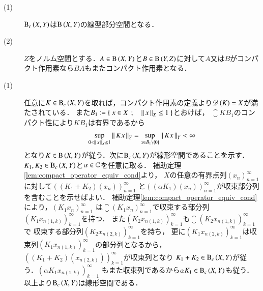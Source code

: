 	\begin{screen}
		\begin{prp}\mbox{}
			\begin{description}
				\item[(1)] $\mathrm{B}_c\left(X,Y\right) $は$\mathrm{B}\left(X,Y\right) $の線型部分空間となる．
				\item[(2)] $Z$をノルム空間とする．$A \in \mathrm{B}\left(X,Y\right) $と$B \in \mathrm{B}\left(Y,Z\right) $に対して$A$又は$B$がコンパクト作用素なら$BA$もまたコンパクト作用素となる．
			\end{description}
			\label{prp:compact_operator_bounded_composition_of_compact_operators}
		\end{prp}
	\end{screen}
	
	\begin{prf}\mbox{}
		\begin{description}
			\item[(1)] 
				任意に$K \in \mathrm{B}_c\left(X,Y\right) $を取れば，コンパクト作用素の定義より$\Dom{K} = X$が満たされている．
				また$B_1 \coloneqq \left\{\ x \in X\ \, ; \quad \left\|\, x\, \right\|_{X} \leq 1\ \right\}$とおけば，
				$\closure{KB_1}$のコンパクト性により$KB_1$は有界であるから
				\begin{align}
					\operatorname*{sup}_{0 < \left\|\, x\, \right\|_{X} \leq 1} \left\|\, Kx\, \right\|_{Y} = \operatorname*{sup}_{x \in B_1 \backslash \{0\}} \left\|\, Kx\, \right\|_{Y} < \infty
				\end{align}
				となり$K \in \mathrm{B}\left(X,Y\right) $が従う．次に$\mathrm{B}_c\left(X,Y\right) $が線形空間であることを示す．
				$K_1, K_2 \in \mathrm{B}_c\left(X,Y\right) $と$\alpha \in \mathbb{C}$を任意に取る．
				補助定理\ref{lem:compact_operator_equiv_cond}より，
				$X$の任意の有界点列$(x_n)_{n=1}^{\infty}$に対して$\left( (K_1 + K_2)\left(x_n\right) \right)_{n=1}^{\infty}$
				と$\left( (\alpha K_1)\left(x_n\right) \right)_{n=1}^{\infty}$が収束部分列を含むことを示せばよい．
				補助定理\ref{lem:compact_operator_equiv_cond}により，$(K_1x_n)_{n=1}^{\infty}$
				は$\closure{(K_1x_n)_{n=1}^{\infty}}$で収束する部分列$\left(K_1x_{n(1,k)}\right)_{k=1}^{\infty}$を持つ．
				また$\left(K_2x_{n(1,k)}\right)_{k=1}^{\infty}$も$\closure{\left(K_2x_{n(1,k)}\right)_{k=1}^{\infty}}$で
				収束する部分列$\left(K_2x_{n(2,k)}\right)_{k=1}^{\infty}$を持ち，
				更に$\left(K_1x_{n(2,k)}\right)_{k=1}^{\infty}$は収束列$\left(K_1x_{n(1,k)}\right)_{k=1}^{\infty}$の部分列となるから，
				$\left( (K_1 + K_2)\left(x_{n(2,k)}\right) \right)_{k=1}^{\infty}$が収束列となり
				$K_1 + K_2 \in \mathrm{B}_c\left(X,Y\right) $が従う．$(\alpha K_1x_{n(1,k)})_{k=1}^{\infty}$
				もまた収束列であるから$\alpha K_1 \in \mathrm{B}_c\left(X,Y\right) $も従う．以上より$\mathrm{B}_c\left(X,Y\right) $は線形空間である．
			

\end{description}
\end{prf}
